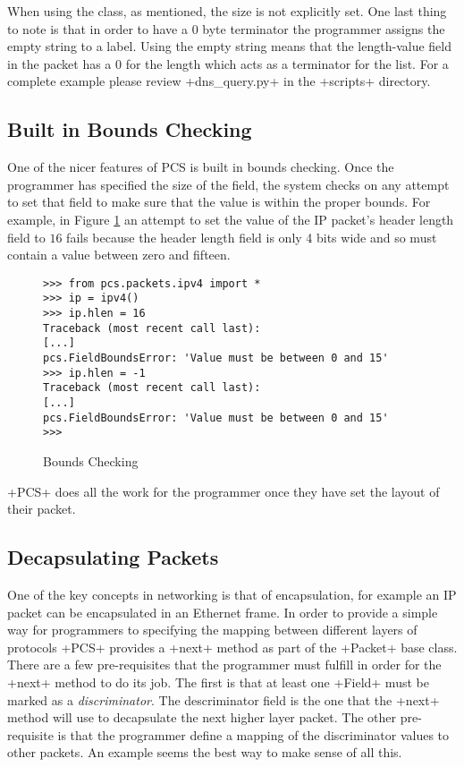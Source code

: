 \documentclass[11pt]{article}
\begin{document}
When using the class, as mentioned, the size is not explicitly set.
One last thing to note is that in order to have a 0 byte terminator
the programmer assigns the empty string to a label.  Using the empty
string means that the length-value field in the packet has a 0 for the
length which acts as a terminator for the list.  For a complete
example please review \file+dns\_query.py+ in the \file+scripts+
directory.

\subsection{Built in Bounds Checking}
\label{sec:built-in-bounds-checking}

One of the nicer features of PCS is built in bounds checking.  Once
the programmer has specified the size of the field, the system checks
on any attempt to set that field to make sure that the value is within
the proper bounds.  For example, in Figure \ref{fig:bounds-checking-1}
an attempt to set the value of the IP packet's header length field to
$16$ fails because the header length field is only 4 bits wide and so
must contain a value between zero and fifteen.

\begin{figure}
  \centering
\begin{lstlisting}
>>> from pcs.packets.ipv4 import *
>>> ip = ipv4()
>>> ip.hlen = 16
Traceback (most recent call last):
[...]
pcs.FieldBoundsError: 'Value must be between 0 and 15'
>>> ip.hlen = -1
Traceback (most recent call last):
[...]
pcs.FieldBoundsError: 'Value must be between 0 and 15'
>>> 
\end{lstlisting}
  \caption{Bounds Checking}
  \label{fig:bounds-checking-1}
\end{figure}

\program+PCS+ does all the work for the programmer once they have set
the layout of their packet.

\subsection{Decapsulating Packets}
\label{sec:decapsulating_packets}

One of the key concepts in networking is that of encapsulation, for
example an IP packet can be encapsulated in an Ethernet frame.  In
order to provide a simple way for programmers to specifying the
mapping between different layers of protocols \program+PCS+ provides a
\method+next+ method as part of the \class+Packet+ base class. There
are a few pre-requisites that the programmer must fulfill in order for
the \method+next+ method to do its job.  The first is that at least
one \class+Field+ must be marked as a \emph{discriminator}.  The
descriminator field is the one that the \method+next+ method will use
to decapsulate the next higher layer packet.  The other pre-requisite
is that the programmer define a mapping of the discriminator values to
other packets.  An example seems the best way to make sense of all
this.
\end{document}
